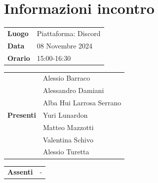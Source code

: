 \section{Informazioni incontro}
\vspace{0.25cm}
\begin{tabular}{p{1.75cm} | l}
    \textbf{Luogo} & Piattaforma: Discord\\
    \textbf{Data} & 08 Novembre 2024\\
    \textbf{Orario} & 15:00-16:30\\
\end{tabular}

\vspace{0.5cm}
\noindent
\begin{tabular}{p{1.75cm} | l}
    \multirow{7}{*}{\textbf{Presenti}}
        & Alessio Barraco\\
        & Alessandro Damiani \textcolor{gray}{}\\ %
        & Alba Hui Larrosa Serrano\\
        & Yuri Lunardon\\
        & Matteo Mazzotti\\
        & Valentina Schivo\\
        & Alessio Turetta
\end{tabular}

\vspace{0.5cm}
\noindent
\begin{tabular}{p{1.75cm} | l}
    \multirow{1}{*}{\textbf{Assenti}}
        & -\\
\end{tabular}

\vspace{0.5cm}
\noindent
\begin{tabular}{p{1.75cm} | l}
\end{tabular}